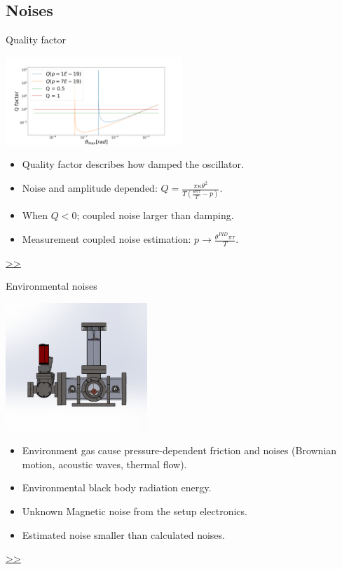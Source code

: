 \documentclass{beamer}
\begin{document}
\subsection{Noises}

\begin{frame}{\hypertarget{frame:Quality factor}{Quality factor}}
	\begin{center}		
		\includegraphics[width=0.5\textwidth,keepaspectratio]{Q factor.png}
	\end{center}
	\begin{itemize}	
		\item Quality factor describes how damped the oscillator.
		\item Noise and amplitude depended: $Q =  \frac{\pi\kappa\theta^2}{T(\frac{\theta\pi\tau}{T} -p)} $.
		\item When $Q<0$; coupled noise larger than damping.
		\item Measurement coupled noise estimation: $p \rightarrow \frac{ \theta^{PID}\pi\tau}{T}$. 
	\end{itemize}
	\hyperlink{frame:Quality factor 1}{>>} 
\end{frame}

\begin{frame}{\hypertarget{frame:Environmental noises}{Environmental noises}}
	\begin{center}		
		\includegraphics[width=0.4\textwidth,keepaspectratio]{total_chamber.png}
    \end{center}
	\begin{itemize}
		
		\item Environment gas cause pressure-dependent friction and noises (Brownian motion, acoustic waves, thermal flow).  
		\item Environmental black body radiation energy.
		\item Unknown Magnetic noise from the setup electronics.
		\item Estimated noise smaller than calculated noises.				

			
	\end{itemize}
	\hyperlink{frame:Environmental noises 1}{>>} 
\end{frame}
\end{document}
